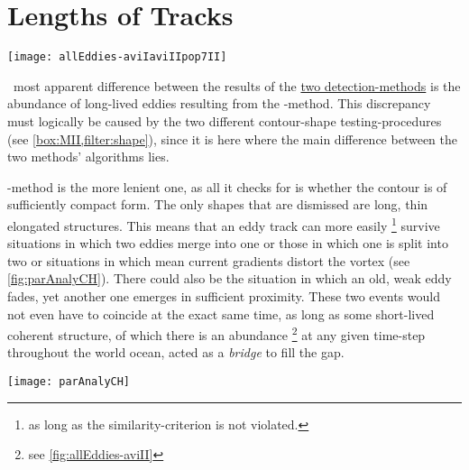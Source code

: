 \label{chap:discussion}

 

\section{Lengths of Tracks}
\label{section:lengthoftracks}
\begin{marginfigure}
	\label{fig:allEddies-aviIaviIIpop7II}
	\texttt{[image: allEddies-aviIaviIIpop7II]}
	\caption{All contours that passed the filtering procedure for one exemplary time-step. Top: \aviI. Mid: \aviII. Bottom: \popSevenII.}
\end{marginfigure}
~most apparent difference between the results of the \href{box:MI}{two detection-methods} is the abundance of long-lived eddies resulting from the \MI-method.
This discrepancy must logically be caused by the two different contour-shape testing-procedures (see \cref{box:MII,filter:shape}), since it is here where the main difference between the two methods' algorithms lies.



 \MI-method is the more lenient one, as all it checks for is whether the contour is of sufficiently compact form. The only shapes that are dismissed are long, thin elongated structures. This means that \eg an eddy track can more easily \footnote{as long as the similarity-criterion is not violated.} survive situations in which two eddies merge into one or those in which one is split into two or situations in which mean current gradients distort the vortex (see \cref{fig:parAnalyCH}). There could also be the situation in which an old, weak eddy fades, yet another one emerges in sufficient proximity. These two events would not even have to coincide at the exact same time, as long as some short-lived coherent structure, of which there is an abundance \footnote{see \cref{fig:allEddies-aviII}} at any given time-step throughout the world ocean, acted as a \textit{bridge} to fill the gap.



\begin{figure*}
\texttt{[image: parAnalyCH]}
\caption{The \MI-method. Top: Consecutive contours of one track. Colors indicate percentage of change of contour's area with respect to the prior time-step. Topmost horizontal axis shows the (rounded) factor of $\scale$ with respect to the local first baroclinic $\Lr$. Vectors' lengths are proportional to the distance travelled with respect to the next time-step. Bottom: Blue graph shows the current $\IQ$. Bars show the factors of change of respective parameters with respect to the prior time-step. X-axis are days since birth.}
\label{fig:parAnalyCH}
\end{figure*}

